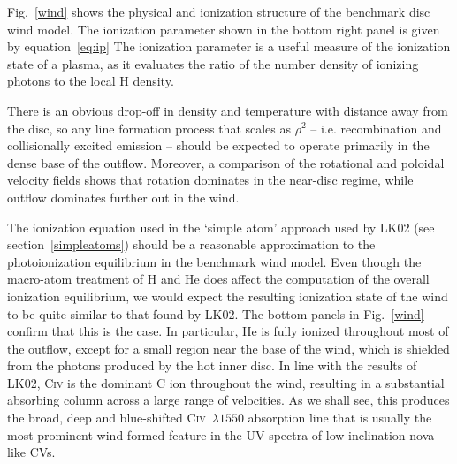 Fig.~\ref{wind} shows the physical and ionization structure 
of the benchmark disc wind model. The ionization parameter shown in the bottom
right panel is given by equation~\ref{eq:ip}
 The ionization parameter is a useful measure of the ionization state of a plasma, 
as it evaluates the ratio of the number density of ionizing photons to the local 
H density.

There is an obvious drop-off in density
and temperature with distance away from the disc, so any line
formation process that scales as $\rho^2$ -- i.e. recombination and
collisionally excited emission -- should be expected to operate
primarily in the dense base of the outflow. Moreover, a comparison of
the rotational and poloidal velocity fields shows that rotation
dominates in the near-disc regime, while outflow dominates further out
in the wind. 

The ionization equation used in the `simple atom' approach used by
LK02 (see section~\ref{simpleatoms}) should be a reasonable approximation to
the photoionization equilibrium in the benchmark wind model. Even
though the macro-atom treatment of H and He does affect the 
computation of the overall ionization equilibrium, we would expect the
resulting ionization state of the wind to be quite similar to that
found by LK02. The bottom panels in Fig.~\ref{wind} confirm that this
is the case. In particular, He is fully ionized
throughout most of the outflow, except for a small region near the
base of the wind, which is shielded from the photons produced by the
hot inner disc. In line with the results of LK02,
C\textsc{iv} is the dominant C ion throughout the wind,
resulting in a substantial absorbing column across a large range of
velocities. As we shall see, this produces the broad, deep and
blue-shifted C\textsc{iv}~$\lambda1550$ absorption line that
is usually the most prominent wind-formed feature in the UV spectra of
low-inclination nova-like CVs.

